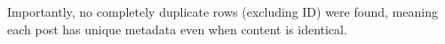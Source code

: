
Importantly, no completely duplicate rows (excluding ID) were found, meaning each post has unique metadata even when content is identical.







